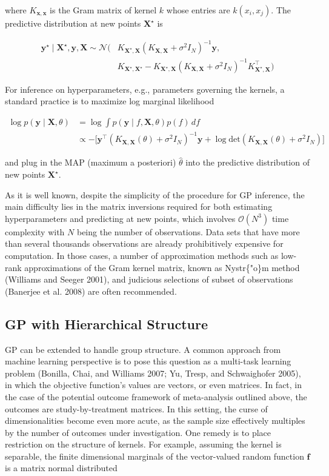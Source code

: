 \noindent where \(K_{\bm x, \bm x}\) is the Gram matrix of kernel \(k\)
whose entries are \(k(x_i, x_j)\). The predictive distribution at new
points \(\bm X^\star\) is

\begin{align*}
\bm y^\star \mid \bm X^\star, \bm y, \bm X \sim \mathcal{N}(&K_{\bm X^\star, \bm X}(K_{\bm X,
\bm X}+\sigma^2I_N)^{-1}\bm y, \\
& K_{\bm X^\star, \bm X^\star}-K_{\bm X^\star, \bm X}(K_{\bm X, \bm X}+\sigma^2I_N)^{-1}K_{\bm X^\star, \bm X}^\intercal)
\end{align*}

\noindent For inference on hyperparameters, e.g., parameters governing
the kernels, a standard practice is to maximize log marginal likelihood

\begin{align*}
\log p(\bm y \mid \bm X, \theta)&=\log \int p(\bm y \mid f, \bm X, \theta) p(f)\, df \\
    & \propto
    -\big[\bm y^\intercal(K_{\bm X, \bm X}(\theta)+\sigma^2I_N)^{-1} \bm y + \log\text{det}(K_{\bm X, \bm X}(\theta)+\sigma^2I_N)\big]
\end{align*}

\noindent and plug in the MAP (maximum a posteriori) \(\hat \theta\)
into the predictive distribution of new points \(\bm X^\star\).

As it is well known, despite the simplicity of the procedure for GP
inference, the main difficulty lies in the matrix inversions required
for both estimating hyperparameters and predicting at new points, which
involves \(\mathcal{O}(N^3)\) time complexity with \(N\) being the
number of observations. Data sets that have more than several thousands
observations are already prohibitively expensive for computation. In
those cases, a number of approximation methods such as low-rank
approximations of the Gram kernel matrix, known as Nystr\{"o\}m method
(Williams and Seeger 2001), and judicious selections of subset of
observations (Banerjee et al. 2008) are often recommended.

\subsection{GP with Hierarchical
Structure}\label{gp-with-hierarchical-structure}

GP can be extended to handle group structure. A common approach from
machine learning perspective is to pose this question as a multi-task
learning problem (Bonilla, Chai, and Williams 2007; Yu, Tresp, and
Schwaighofer 2005), in which the objective function's values are
vectors, or even matrices. In fact, in the case of the potential outcome
framework of meta-analysis outlined above, the outcomes are
study-by-treatment matrices. In this setting, the curse of
dimensionalities become even more acute, as the sample size effectively
multiples by the number of outcomes under investigation. One remedy is
to place restriction on the structure of kernels. For example, assuming
the kernel is separable, the finite dimensional marginals of the
vector-valued random function \(\bm f\) is a matrix normal distributed

